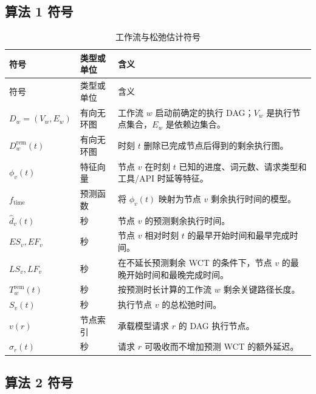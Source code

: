 \documentclass[UTF8,11pt,a4paper,fontset=fandol]{ctexart}
\begin{document}
\subsection{算法 1 符号}

\begin{longtable}{p{}p{}p{}}
  \caption{工作流与松弛估计符号}\label{tab:algorithm1-symbols}\\
  \toprule
  符号 & 类型或单位 & 含义 \\
  \midrule
  \endfirsthead
  \toprule
  符号 & 类型或单位 & 含义 \\
  \midrule
  \endhead
  $D_w=(V_w,E_w)$ & 有向无环图
    & 工作流 $w$ 启动前确定的执行 DAG；$V_w$ 是执行节点集合，$E_w$ 是依赖边集合。 \\
  $D_w^{\mathrm{rem}}(t)$ & 有向无环图
    & 时刻 $t$ 删除已完成节点后得到的剩余执行图。 \\
  $\phi_v(t)$ & 特征向量
    & 节点 $v$ 在时刻 $t$ 已知的进度、词元数、请求类型和工具/API 时延等特征。 \\
  $f_{\mathrm{time}}$ & 预测函数
    & 将 $\phi_v(t)$ 映射为节点 $v$ 剩余执行时间的模型。 \\
  $\widehat d_v(t)$ & 秒
    & 节点 $v$ 的预测剩余执行时间。 \\
  $ES_v,EF_v$ & 秒
    & 节点 $v$ 相对时刻 $t$ 的最早开始时间和最早完成时间。 \\
  $LS_v,LF_v$ & 秒
    & 在不延长预测剩余 WCT 的条件下，节点 $v$ 的最晚开始时间和最晚完成时间。 \\
  $T_w^{\mathrm{rem}}(t)$ & 秒
    & 按预测时长计算的工作流 $w$ 剩余关键路径长度。 \\
  $S_v(t)$ & 秒
    & 执行节点 $v$ 的总松弛时间。 \\
  $v(r)$ & 节点索引
    & 承载模型请求 $r$ 的 DAG 执行节点。 \\
  $\widehat\sigma_r(t)$ & 秒
    & 请求 $r$ 可吸收而不增加预测 WCT 的额外延迟。 \\
  \bottomrule
\end{longtable}

\subsection{算法 2 符号}
\end{document}

